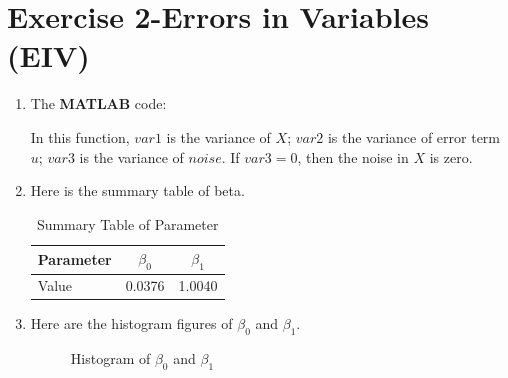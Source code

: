 \documentclass[12pt,letterpaper]{article}
\begin{document}
\newpage


\section*{Exercise 2-Errors in Variables (EIV)}
  \begin{enumerate}[label=\textbf{(\Alph*)}]
\item The \textbf{MATLAB} code:


In this function, $var1$ is the variance of $X$; $var2$ is the variance of error term $u$; $var3$ is the variance of $noise$. If $var3=0$, then the noise in $X$ is zero. 

\item Here is the summary table of beta.
\begin{table}[ht]
	\footnotesize
	\caption{Summary Table of Parameter}
	\centering %
	\begin{tabular}{lcc} %
		
		\hline %
		\hline %
	Parameter&$\beta_0$&$\beta_1$\\ \hline
	Value&0.0376&1.0040\\
		
		\hline %
		
	\end{tabular}
\end{table} 

\item
Here are the histogram figures of $\beta_0$ and $\beta_1$.
 \begin{figure}[H]
	\centering
	\caption{ Histogram of $\beta_0$ and $\beta_1$}
\end{figure}


\end{enumerate}
\end{document}
